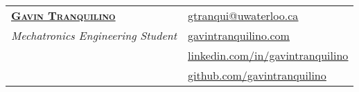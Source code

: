 \documentclass[letterpaper]{article}
\begin{document}
\linespread{1.25}




\begin{center}
    \begin{tabularx}{\textwidth}{@{}X X@{}}
        \textbf{\Huge \scshape \href{https://www.gavintranquilino.com}{Gavin Tranquilino}} & 
        \textbf{\hfill} \href{mailto:gtranqui@uwaterloo.ca}{\underline{gtranqui@uwaterloo.ca}} \\
        \textit{\Large Mechatronics Engineering Student} & \textbf{\hfill} \href{https://www.gavintranquilino.com}{\underline{gavintranquilino.com}} \\
        & \textbf{\hfill} \href{https://linkedin.com/in/gavintranquilino}{\underline{linkedin.com/in/gavintranquilino}} \\
        & \textbf{\hfill} \href{https://github.com/gavintranquilino}{\underline{github.com/gavintranquilino}}
    \end{tabularx}
\end{center}
\end{document}

